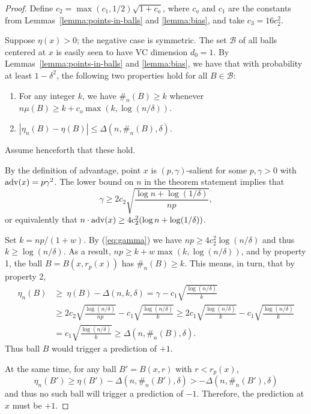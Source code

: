 \documentclass{article}
\def\B{{\mathcal B}}
\def\supp{{\rm supp}}
\def\adv{{\rm adv}}
\newtheorem{lemma}[theorem]{Lemma}
\begin{document}
\begin{proof}
Define $c_2 = \max(c_1, 1/2) \sqrt{1+c_o}$, where $c_o$ and $c_1$ are the constants from Lemmas~\ref{lemma:points-in-balls} and \ref{lemma:bias}, and take $c_3 = 16 c_2^2$.

Suppose $\eta(x) > 0$; the negative case is symmetric. The set $\B$ of all balls centered at $x$ is easily seen to have VC dimension $d_0 = 1$. By Lemmas~\ref{lemma:points-in-balls} and \ref{lemma:bias}, we have that with probability at least $1-\delta^2$, the following two properties hold for all $B \in \B$:
\begin{enumerate}
\item For any integer $k$, we have $\#_n(B) \geq k$ whenever $n \mu(B) \geq k + c_o \max(k, \log (n/\delta))$.
\item $|\eta_n(B) - \eta(B)| \leq \Delta(n, \#_n(B), \delta)$.
\end{enumerate}
Assume henceforth that these hold.

By the definition of advantage, point $x$ is $(p,\gamma)$-salient for some $p,\gamma> 0$ with $\adv(x) = p\gamma^2$. The lower bound on $n$ in the theorem statement implies that
\begin{equation}
\gamma \geq 2c_2 \sqrt{\frac{\log n + \log (1/\delta)}{np}} ,
\label{eq:gamma}
\end{equation}
or equivalently that $n \cdot \adv(x) \geq 4c_2^2 (\log n + \log (1/\delta))$.

Set $k = np/(1 + w)$. By (\ref{eq:gamma}) we have $np \geq 4 c_2^2 \log (n/\delta)$ and thus $k \geq \log (n/\delta)$. As a result, $np \geq k + w \max(k, \log (n/\delta))$, and by property 1, the ball $B = B(x, r_p(x))$ has $\#_n(B) \geq k$. This means, in turn, that by property 2,
\begin{align*}
\eta_n(B) &\geq \ \eta(B) - \Delta(n, k, \delta)
= \gamma - c_1 \sqrt{\frac{\log (n/\delta)}{k}} \\
&\geq 2c_2 \sqrt{\frac{\log (n/\delta)}{np}} - c_1 \sqrt{\frac{\log (n/\delta)}{k}}
\geq 2c_1 \sqrt{\frac{\log (n/\delta)}{k}} - c_1 \sqrt{\frac{\log (n/\delta)}{k}} \\
&= c_1 \sqrt{\frac{\log (n/\delta)}{k}} \geq \Delta(n, \#_n(B), \delta) .
\end{align*}
Thus ball $B$ would trigger a prediction of $+1$.

At the same time, for any ball $B' = B(x, r)$ with $r < r_p(x)$,
$$ \eta_n(B') \geq \eta(B') - \Delta(n, \#_n(B'), \delta) > -\Delta(n, \#_n(B'), \delta) $$
and thus no such ball will trigger a prediction of $-1$. Therefore, the prediction at $x$ must be $+1$.
\end{proof}
\end{document}
